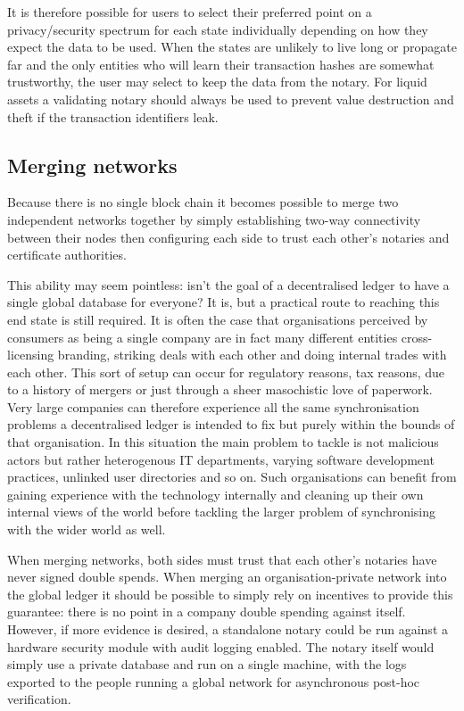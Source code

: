 \documentclass{article}
\begin{document}
It is therefore possible for users to select their preferred point on a privacy/security spectrum for each state individually
depending on how they expect the data to be used. When the states are unlikely to live long or propagate far and the only
entities who will learn their transaction hashes are somewhat trustworthy, the user may select to keep the data from the
notary. For liquid assets a validating notary should always be used to prevent value destruction and theft if the transaction
identifiers leak.

\subsection{Merging networks}

Because there is no single block chain it becomes possible to merge two independent networks together by simply establishing
two-way connectivity between their nodes then configuring each side to trust each other's notaries and certificate authorities.

This ability may seem pointless: isn't the goal of a decentralised ledger to have a single global database for everyone?
It is, but a practical route to reaching this end state is still required. It is often the case that organisations
perceived by consumers as being a single company are in fact many different entities cross-licensing branding, striking
deals with each other and doing internal trades with each other. This sort of setup can occur for regulatory reasons,
tax reasons, due to a history of mergers or just through a sheer masochistic love of paperwork. Very large companies can
therefore experience all the same synchronisation problems a decentralised ledger is intended to fix but purely within
the bounds of that organisation. In this situation the main problem to tackle is not malicious actors but rather
heterogenous IT departments, varying software development practices, unlinked user directories and so on.
Such organisations can benefit from gaining experience with the technology internally and cleaning up their own
internal views of the world before tackling the larger problem of synchronising with the wider world as well.

When merging networks, both sides must trust that each other's notaries have never signed double spends. When merging an
organisation-private network into the global ledger it should be possible to simply rely on incentives to provide
this guarantee: there is no point in a company double spending against itself. However, if more evidence is desired, a
standalone notary could be run against a hardware security module with audit logging enabled. The notary itself would simply
use a private database and run on a single machine, with the logs exported to the people running a global network for
asynchronous post-hoc verification.
\end{document}

